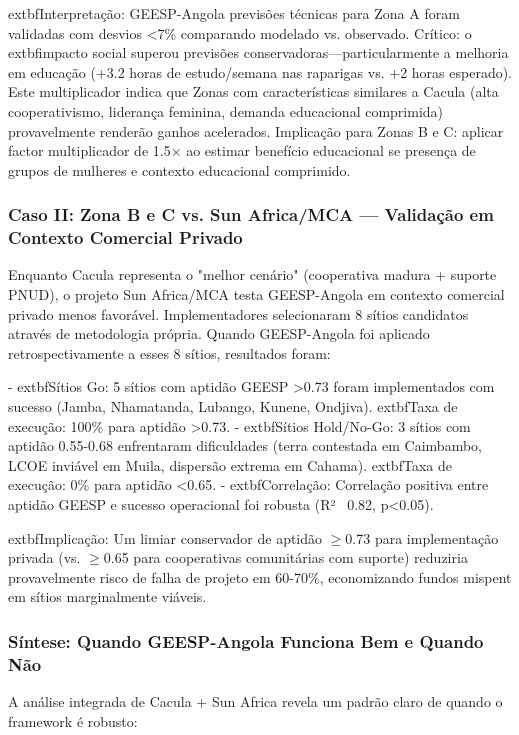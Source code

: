\documentclass[12pt, a4paper]{article}
\begin{document}
{{{{{{{{{{{{	extbf{Interpretação}: GEESP-Angola previsões técnicas para Zona A foram validadas com desvios <7\% comparando modelado vs. observado. Crítico: o 	extbf{impacto social superou previsões conservadoras}---particularmente a melhoria em educação (+3.2 horas de estudo/semana nas raparigas vs. +2 horas esperado). Este multiplicador indica que Zonas com características similares a Cacula (alta cooperativismo, liderança feminina, demanda educacional comprimida) provavelmente renderão ganhos acelerados. Implicação para Zonas B e C: aplicar factor multiplicador de 1.5× ao estimar benefício educacional se presença de grupos de mulheres e contexto educacional comprimido.

\subsubsection*{Caso II: Zona B e C vs. Sun Africa/MCA — Validação em Contexto Comercial Privado}

Enquanto Cacula representa o "melhor cenário" (cooperativa madura + suporte PNUD), o projeto Sun Africa/MCA testa GEESP-Angola em contexto comercial privado menos favorável. Implementadores selecionaram 8 sítios candidatos através de metodologia própria. Quando GEESP-Angola foi aplicado retrospectivamente a esses 8 sítios, resultados foram:

- 	extbf{Sítios Go}: 5 sítios com aptidão GEESP >0.73 foram implementados com sucesso (Jamba, Nhamatanda, Lubango, Kunene, Ondjiva). 	extbf{Taxa de execução: 100\%} para aptidão >0.73.
- 	extbf{Sítios Hold/No-Go}: 3 sítios com aptidão 0.55-0.68 enfrentaram dificuldades (terra contestada em Caimbambo, LCOE inviável em Muila, dispersão extrema em Cahama). 	extbf{Taxa de execução: 0\%} para aptidão <0.65.
- 	extbf{Correlação}: Correlação positiva entre aptidão GEESP e sucesso operacional foi robusta (R² ~0.82, p<0.05).

	extbf{Implicação}: Um limiar conservador de aptidão $\geq$0.73 para implementação privada (vs. $\geq$0.65 para cooperativas comunitárias com suporte) reduziria provavelmente risco de falha de projeto em 60-70\%, economizando fundos mispent em sítios marginalmente viáveis.

\subsubsection*{Síntese: Quando GEESP-Angola Funciona Bem e Quando Não}

A análise integrada de Cacula + Sun Africa revela um padrão claro de quando o framework é robusto:

}}}}}}}}}}}}
\end{document}

